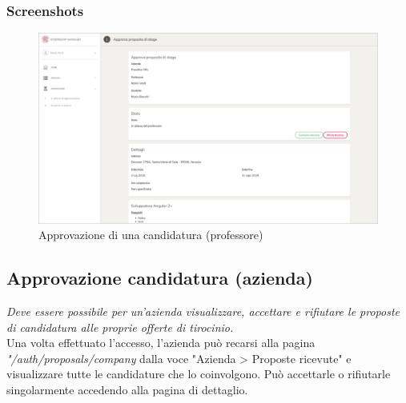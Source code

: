 \subsubsection{Screenshots}
\begin{figure}[H]
	\centering
	\includegraphics[width=1\textwidth]{Figs/screenshots/internshipproposalapprove}     
	\caption[Screenshot: approvazione di una candidatura (professore)]{Approvazione di una candidatura (professore)}
	\label{fig:screenshot:5}
\end{figure}

\pagebreak
\subsection{Approvazione candidatura (azienda)}

\textit{Deve essere possibile per un'azienda visualizzare, accettare e rifiutare le proposte di candidatura alle proprie offerte di tirocinio.} \\

\noindent
Una volta effettuato l'accesso, l'azienda può recarsi alla pagina \textit{"/auth/proposals/company} dalla voce "Azienda > Proposte ricevute" e visualizzare tutte le candidature che lo coinvolgono. Può accettarle o rifiutarle singolarmente accedendo alla pagina di dettaglio.


